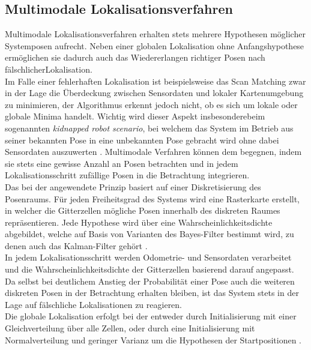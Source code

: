 \subsection{Multimodale Lokalisationsverfahren}
Multimodale Lokalisationsverfahren erhalten stets mehrere Hypothesen möglicher Systemposen aufrecht. Neben einer globalen Lokalisation ohne Anfangshypothese ermöglichen sie dadurch auch das Wiedererlangen richtiger Posen nach fälschlicher\red[/fehlgeschlagener] Lokalisation.\\
Im Falle einer fehlerhaften Lokalisation ist beispielsweise das Scan Matching zwar in der Lage die Überdeckung zwischen Sensordaten und lokaler Kartenumgebung zu minimieren, der Algorithmus erkennt jedoch nicht, ob es sich um lokale oder globale Minima handelt. Wichtig wird dieser Aspekt insbesondere beim sogenannten \textit{kidnapped robot scenario}, bei welchem das System im Betrieb aus seiner bekannten Pose in eine unbekannten Pose gebracht wird ohne dabei Sensordaten auszuwerten \cite{Yic2011}. Multimodale Verfahren können dem begegnen, indem sie stets eine gewisse Anzahl an Posen betrachten und in jedem Lokalisationsschritt zufällige Posen in die Betrachtung integrieren.\\

Das bei der  angewendete Prinzip basiert auf einer Diskretisierung des Posenraums. Für jeden Freiheitsgrad des Systems wird eine Rasterkarte erstellt, in welcher die Gitterzellen mögliche Posen innerhalb des diskreten Raumes repräsentieren. Jede Hypothese wird über eine Wahrscheinlichkeitsdichte abgebildet, welche auf Basis von Varianten des Bayes-Filter \red[erklären? wo?] bestimmt wird, zu denen auch das Kalman-Filter gehört \cite{Hertzberg2012}.\\
In jedem Lokalisationsschritt werden Odometrie-  und Sensordaten verarbeitet und die Wahrscheinlichkeitsdichte der Gitterzellen basierend darauf angepasst. Da selbst bei deutlichem Anstieg der Probabilität einer Pose auch die weiteren diskreten Posen in der Betrachtung erhalten bleiben, ist das System stets in der Lage auf fälschliche Lokalisationen zu reagieren.\\
Die globale Lokalisation erfolgt bei der  entweder durch Initialisierung mit einer Gleichverteilung über alle Zellen, oder durch eine Initialisierung mit Normalverteilung und geringer Varianz um die Hypothesen der Startpositionen \cite{Hertzberg2012}.\\

